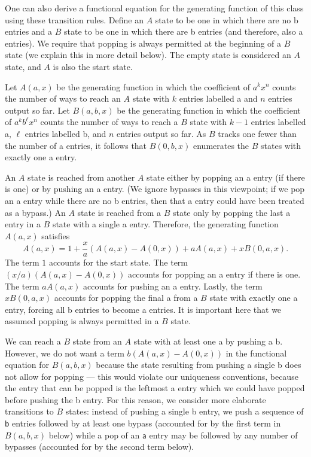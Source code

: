 \documentclass[10pt]{article}
\theoremstyle{plain}
\theoremstyle{definition}
\begin{document}
One can also derive a functional equation for the generating function of this class using these transition rules. Define an $A$ state to be one in which there are no \textsf{b} entries and a $B$ state to be one in which there are \textsf{b} entries (and therefore, also \textsf{a} entries). We require that popping is always permitted at the beginning of a $B$ state (we explain this in more detail below). The empty state is considered an $A$ state, and $A$ is also the start state. 

Let $A(a,x)$ be the generating function in which the coefficient of $a^kx^n$ counts the number of ways to reach an $A$ state with $k$ entries labelled \textsf{a} and $n$ entries output so far. Let $B(a,b,x)$ be the generating function in which the coefficient of $a^k b^\ell x^n$ counts the number of ways to reach a $B$ state with $k-1$ entries labelled \textsf{a}, $\ell$ entries labelled \textsf{b}, and $n$ entries output so far. As $B$ tracks one fewer than the number of \textsf{a} entries, it follows that $B(0,b,x)$ enumerates the $B$ states with exactly one \textsf{a} entry.

An $A$ state is reached from another $A$ state either by popping an \textsf{a} entry (if there is one) or by pushing an \textsf{a} entry. (We ignore bypasses in this viewpoint; if we pop an \textsf{a} entry while there are no \textsf{b} entries, then that \textsf{a} entry could have been treated as a bypass.) An $A$ state is reached from a $B$ state only by popping the last \textsf{a} entry in a $B$ state with a single \textsf{a} entry. Therefore, the generating function $A(a,x)$ satisfies
\[
	A(a,x) = 1 + \frac{x}{a}(A(a,x)-A(0,x)) + aA(a,x) + xB(0,a,x).
\]
The term $1$ accounts for the start state. The term $(x/a)(A(a,x)-A(0,x))$ accounts for popping an \textsf{a} entry if there is one. The term $aA(a,x)$ accounts for pushing an \textsf{a} entry. Lastly, the term $xB(0,a,x)$ accounts for popping the final \textsf{a} from a $B$ state with exactly one \textsf{a} entry, forcing all \textsf{b} entries to become \textsf{a} entries. It is important here that we assumed popping is always permitted in a $B$ state.

We can reach a $B$ state from an $A$ state with at least one \textsf{a} by pushing a \textsf{b}. However, we do not want a term $b(A(a,x)-A(0,x))$ in the functional equation for $B(a,b,x)$ because the state resulting from pushing a single \textsf{b} does not allow for popping --- this would violate our uniqueness conventions, because the entry that can be popped is the leftmost \textsf{a} entry which we could have popped before pushing the \textsf{b} entry. For this reason, we consider more elaborate transitions to $B$ states: instead of pushing a single \textsf{b} entry, we push a sequence of $\textsf{b}$ entries followed by at least one bypass (accounted for by the first term in $B(a,b,x)$ below) while a pop of an $\textsf{a}$ entry may be followed by any number of bypasses (accounted for by the second term below).
\end{document}
